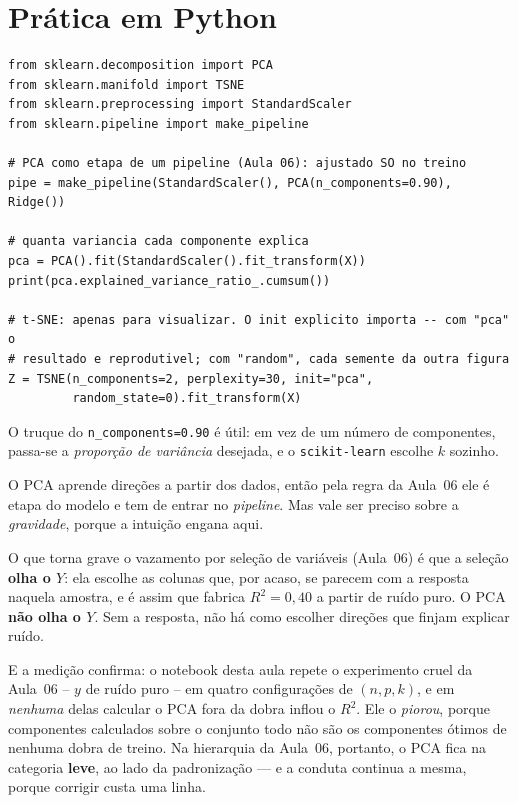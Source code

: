 \documentclass[11pt,a4paper]{article}
\begin{document}
\section{Prática em Python}
\begin{lstlisting}
from sklearn.decomposition import PCA
from sklearn.manifold import TSNE
from sklearn.preprocessing import StandardScaler
from sklearn.pipeline import make_pipeline

# PCA como etapa de um pipeline (Aula 06): ajustado SO no treino
pipe = make_pipeline(StandardScaler(), PCA(n_components=0.90), Ridge())

# quanta variancia cada componente explica
pca = PCA().fit(StandardScaler().fit_transform(X))
print(pca.explained_variance_ratio_.cumsum())

# t-SNE: apenas para visualizar. O init explicito importa -- com "pca" o
# resultado e reprodutivel; com "random", cada semente da outra figura
Z = TSNE(n_components=2, perplexity=30, init="pca",
         random_state=0).fit_transform(X)
\end{lstlisting}
O truque do \texttt{n\_components=0.90} é útil: em vez de um número de componentes,
passa-se a \emph{proporção de variância} desejada, e o \texttt{scikit-learn} escolhe
$k$ sozinho.

\begin{atencao}
O PCA aprende direções a partir dos dados, então pela regra da Aula~06 ele é etapa
do modelo e tem de entrar no \emph{pipeline}. Mas vale ser preciso sobre a
\emph{gravidade}, porque a intuição engana aqui.

O que torna grave o vazamento por seleção de variáveis (Aula~06) é que a seleção
\textbf{olha o $Y$}: ela escolhe as colunas que, por acaso, se parecem com a
resposta naquela amostra, e é assim que fabrica $R^2=0{,}40$ a partir de ruído puro.
O PCA \textbf{não olha o $Y$}. Sem a resposta, não há como escolher direções que
finjam explicar ruído.

E a medição confirma: o notebook desta aula repete o experimento cruel da Aula~06 --
$y$ de ruído puro -- em quatro configurações de $(n,p,k)$, e em \emph{nenhuma} delas
calcular o PCA fora da dobra inflou o $R^2$. Ele o \emph{piorou}, porque componentes
calculados sobre o conjunto todo não são os componentes ótimos de nenhuma dobra de
treino. Na hierarquia da Aula~06, portanto, o PCA fica na categoria \textbf{leve},
ao lado da padronização --- e a conduta continua a mesma, porque corrigir custa uma
linha.
\end{atencao}
\end{document}
